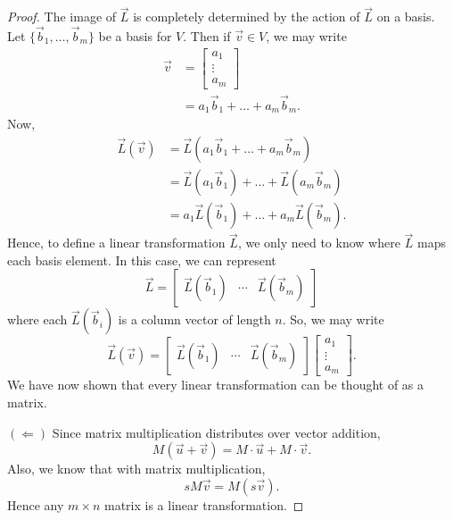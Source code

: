 \documentclass{ximera}
\begin{document}
\begin{lemma}
\begin{proof}
    The image of $\vec{L}$ is completely determined by the action of
    $\vec{L}$ on a basis. Let $\{\vec{b}_1,\dots,\vec{b}_m\}$ be a
    basis for $V$. Then if $\vec{v}\in V$, we may write
    \begin{align*}
      \vec{v} &= \begin{bmatrix}
        a_1\\
        \vdots \\
        a_m
        \end{bmatrix}\\
      &=a_1\vec{b}_1 + \dots + a_m\vec{b}_m.
    \end{align*}
    Now,
    \begin{align*}
      \vec{L}(\vec{v})&=\vec{L}(a_1\vec{b}_1 + \dots + a_m\vec{b}_m)\\
      &= \vec{L}(a_1\vec{b}_1) + \dots + \vec{L}(a_m\vec{b}_m) \\
      &= a_1\vec{L}(\vec{b}_1) + \dots + a_m\vec{L}(\vec{b}_m).
    \end{align*}
    Hence, to define a linear transformation $\vec{L}$, we only need
    to know where $\vec{L}$ maps each basis element. In this case, we
    can represent
    \[
    \vec{L} = \begin{bmatrix}
      \vec{L}(\vec{b}_1) & \cdots & \vec{L}(\vec{b}_m)
    \end{bmatrix}
    \]
    where each $\vec{L}(\vec{b}_i)$ is a column vector of length $n$.
    So, we may write
    \[
    \vec{L}(\vec{v}) = \begin{bmatrix}
      \vec{L}(\vec{b}_1) & \cdots & \vec{L}(\vec{b}_m)
    \end{bmatrix} \begin{bmatrix}
        a_1\\
        \vdots \\
        a_m
        \end{bmatrix}.
    \]
    We have now shown that every linear transformation can be thought of as a matrix.

      $(\Leftarrow)$ Since matrix multiplication distributes over
      vector addition,
      \[
      M(\vec{u}+\vec{v})  = M\cdot \vec{u} + M\cdot \vec{v}.
      \]
      Also, we know that with matrix multiplication,
      \[
      s M \vec{v} = M(s\vec{v}).
      \]
      Hence any $m\times n$ matrix is a linear transformation.
  \end{proof}
\end{lemma}
\end{document}
